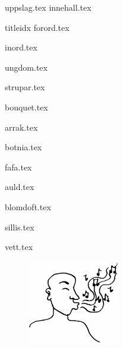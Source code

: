 \documentclass[a6paper,11pt,makeidx,openany]{book}
\begin{document}
{uppslag.tex}
{innehall.tex}

\begin{songs}{titleidx}
{forord.tex}

{inord.tex}
\sclearpage

{ungdom.tex}
\sclearpage

{strupar.tex}	
\sclearpage

{bouquet.tex}	
\sclearpage

{arrak.tex}	
\sclearpage

{botnia.tex}	
\sclearpage

{fafa.tex}	
\sclearpage

{auld.tex}	
\sclearpage

{blomdoft.tex}
\sclearpage

{sillis.tex}
\sclearpage

{vett.tex}
\sclearpage


\end{songs}
\begin{figure}[h]
	\begin{center}
		\includegraphics[width=40mm]{./bilder/fardigabilder/BilderTillKapitel/visslaren.png} 
	\end{center}
\end{figure}
\renewcommand{\idxtitlefont}{\rmfamily\mdseries}
\renewcommand{\idxlyricfont}{\rmfamily\mdseries}
\renewcommand{\idxheadfont}{\sffamily\it\large}
\setlength{\idxheadwidth}{0.5cm}
\end{document}
